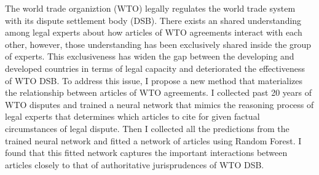 The world trade organiztion (WTO) legally regulates the world trade system with its dispute settlement body (DSB).
There exists an shared understanding among legal experts about how articles of WTO agreements interact with each other, however, 
those understanding has been exclusively shared inside the group of experts.  %
This exclusiveness has widen the gap
between the developing and developed countries in terms of
legal capacity and deteriorated the effectiveness of WTO DSB.
To address this issue, I propose a new method that materializes the relationship between articles of WTO agreements. %
I collected past 20 years of WTO disputes and trained a neural network that mimics the reasoning process of legal experts that determines which articles to cite for given factual circumstances of legal dispute.
Then I collected all the predictions from the trained neural network and fitted a network of articles using Random Forest.
I found that this fitted network captures the important interactions between articles closely to that of authoritative jurisprudences of WTO DSB.